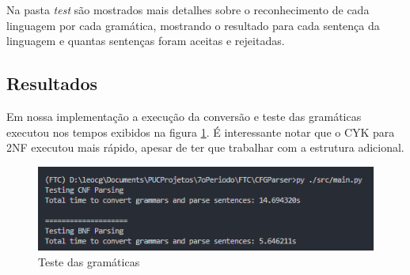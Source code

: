 \documentclass[12pt]{article}
\begin{document}
Na pasta \textit{test} são mostrados mais detalhes sobre o reconhecimento de cada linguagem por cada gramática, mostrando o resultado para cada sentença da linguagem e quantas sentenças foram aceitas e rejeitadas.

\subsection{Resultados}

Em nossa implementação a execução da conversão e teste das gramáticas executou nos tempos exibidos na figura \ref{fig:parsing}. É interessante notar que o CYK para 2NF executou mais rápido, apesar de ter que trabalhar com a estrutura adicional.

\begin{figure}
    \centering
    \includegraphics{parsing.png}
    \caption{Teste das gramáticas}
    \label{fig:parsing}
\end{figure}




\end{document}
